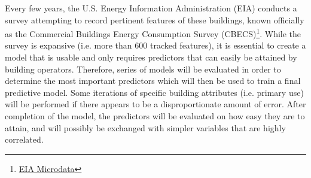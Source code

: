Every few years, the U.S. Energy Information Administration (EIA) conducts a survey attempting to record pertinent features of these buildings, known officially as the Commercial Buildings Energy Consumption Survey (CBECS)\footnote{\href{https://www.eia.gov/consumption/commercial/data/2012/index.php?view=microdata}{EIA Microdata}}.  While the survey is expansive (i.e. more than 600 tracked features), it is essential to create a model that is usable and only requires predictors that can easily be attained by building operators.  Therefore, series of models will be evaluated in order to determine the most important predictors which will then be used to train a final predictive model.  Some iterations of specific building attributes (i.e. primary use) will be performed if there appears to be a disproportionate amount of error.  After completion of the model, the predictors will be evaluated on how easy they are to attain, and will possibly be exchanged with simpler variables that are highly correlated.